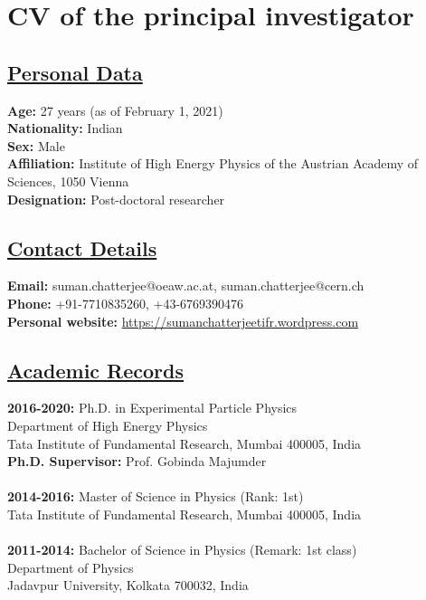 \documentclass[a4paper,11pt]{article}
\begin{document}
\newpage


\section{CV of the principal investigator}

\subsection*{\underline{Personal Data}}

\textbf{Age:} 27 years (as of February 1, 2021)\\
\textbf{Nationality:} Indian \\
\textbf{Sex:} Male \\
\textbf{Affiliation:} Institute of High Energy Physics of the Austrian Academy of Sciences, 1050 Vienna \\
\textbf{Designation:} Post-doctoral researcher 


\subsection*{\underline{Contact Details}}

\textbf{Email:} suman.chatterjee@oeaw.ac.at, suman.chatterjee@cern.ch\\
\textbf{Phone: } +91-7710835260, +43-6769390476\\
\textbf{Personal website: } \href{https://sumanchatterjeetifr.wordpress.com}{https://sumanchatterjeetifr.wordpress.com}


\subsection*{\underline{Academic Records}}

\textbf{2016-2020:}
Ph.D. in Experimental Particle Physics\\
Department of High Energy Physics\\
Tata Institute of Fundamental Research, Mumbai 400005, India\\
\textbf{Ph.D. Supervisor:} Prof. Gobinda Majumder\\
\\
\textbf{2014-2016:}
Master of Science in Physics (Rank: 1st)\\
Tata Institute of Fundamental Research, Mumbai 400005, India\\
\\
\textbf{2011-2014:}
Bachelor of Science in Physics (Remark: 1st class)\\
Department of Physics\\
Jadavpur University, Kolkata  700032, India\\
\end{document}
